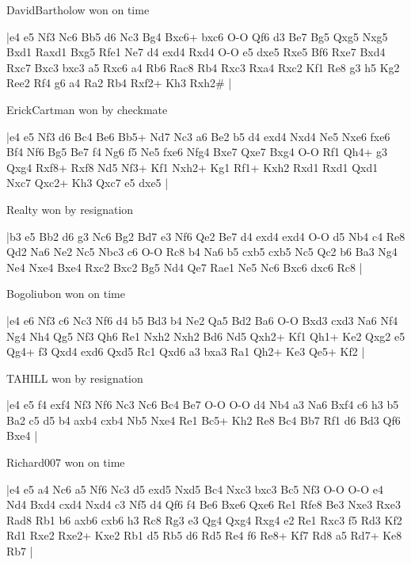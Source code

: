\showboard

DavidBartholow won on time

\makegametitle
|e4 e5 Nf3 Nc6 Bb5 d6 Nc3 Bg4 Bxc6+ bxc6 O-O Qf6 d3 Be7 Bg5 Qxg5 Nxg5 Bxd1 Raxd1 Bxg5 Rfe1 Ne7 d4 exd4 Rxd4 O-O e5 dxe5 Rxe5 Bf6 Rxe7 Bxd4 Rxc7 Bxc3 bxc3 a5 Rxc6 a4 Rb6 Rac8 Rb4 Rxc3 Rxa4 Rxc2 Kf1 Re8 g3 h5 Kg2 Ree2 Rf4 g6 a4 Ra2 Rb4 Rxf2+ Kh3 Rxh2\#  |

\showboard

ErickCartman won by checkmate

\makegametitle
|e4 e5 Nf3 d6 Bc4 Be6 Bb5+ Nd7 Nc3 a6 Be2 b5 d4 exd4 Nxd4 Ne5 Nxe6 fxe6 Bf4 Nf6 Bg5 Be7 f4 Ng6 f5 Ne5 fxe6 Nfg4 Bxe7 Qxe7 Bxg4 O-O Rf1 Qh4+ g3 Qxg4 Rxf8+ Rxf8 Nd5 Nf3+ Kf1 Nxh2+ Kg1 Rf1+ Kxh2 Rxd1 Rxd1 Qxd1 Nxc7 Qxc2+ Kh3 Qxc7 e5 dxe5  |

\showboard

Realty won by resignation

\makegametitle
|b3 e5 Bb2 d6 g3 Nc6 Bg2 Bd7 e3 Nf6 Qe2 Be7 d4 exd4 exd4 O-O d5 Nb4 c4 Re8 Qd2 Na6 Ne2 Nc5 Nbc3 c6 O-O Rc8 b4 Na6 b5 cxb5 cxb5 Nc5 Qc2 b6 Ba3 Ng4 Ne4 Nxe4 Bxe4 Rxc2 Bxc2 Bg5 Nd4 Qe7 Rae1 Ne5 Nc6 Bxc6 dxc6 Rc8  |

\showboard

Bogoliubon won on time

\makegametitle
|e4 e6 Nf3 c6 Nc3 Nf6 d4 b5 Bd3 b4 Ne2 Qa5 Bd2 Ba6 O-O Bxd3 cxd3 Na6 Nf4 Ng4 Nh4 Qg5 Nf3 Qh6 Re1 Nxh2 Nxh2 Bd6 Nd5 Qxh2+ Kf1 Qh1+ Ke2 Qxg2 e5 Qg4+ f3 Qxd4 exd6 Qxd5 Rc1 Qxd6 a3 bxa3 Ra1 Qh2+ Ke3 Qe5+ Kf2  |

\showboard

TAHILL won by resignation

\makegametitle
|e4 e5 f4 exf4 Nf3 Nf6 Nc3 Nc6 Bc4 Be7 O-O O-O d4 Nb4 a3 Na6 Bxf4 c6 h3 b5 Ba2 c5 d5 b4 axb4 cxb4 Nb5 Nxe4 Re1 Bc5+ Kh2 Re8 Bc4 Bb7 Rf1 d6 Bd3 Qf6 Bxe4  |

\showboard

Richard007 won on time

\makegametitle
|e4 e5 a4 Nc6 a5 Nf6 Nc3 d5 exd5 Nxd5 Bc4 Nxc3 bxc3 Bc5 Nf3 O-O O-O e4 Nd4 Bxd4 cxd4 Nxd4 c3 Nf5 d4 Qf6 f4 Be6 Bxe6 Qxe6 Re1 Rfe8 Be3 Nxe3 Rxe3 Rad8 Rb1 b6 axb6 cxb6 h3 Rc8 Rg3 e3 Qg4 Qxg4 Rxg4 e2 Re1 Rxc3 f5 Rd3 Kf2 Rd1 Rxe2 Rxe2+ Kxe2 Rb1 d5 Rb5 d6 Rd5 Re4 f6 Re8+ Kf7 Rd8 a5 Rd7+ Ke8 Rb7  |

